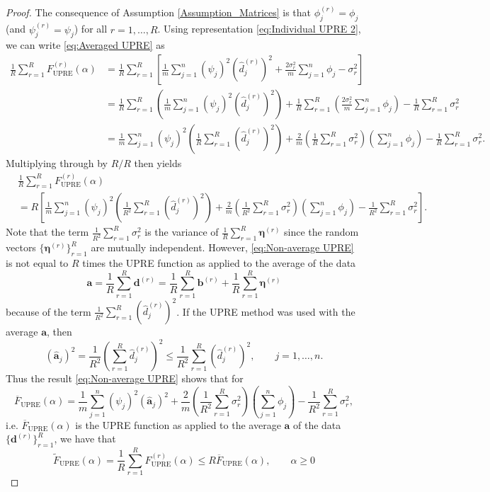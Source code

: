 \documentclass[12pt]{article}
\newcommand{\mA}{m}	%
\newcommand{\aVec}{\mathbf{a}}	%
\newcommand{\bVec}{\mathbf{b}}	%
\newcommand{\dVec}{\mathbf{d}}	%
\newcommand{\dft}[1]{\widehat{#1}}	%
\newcommand{\regparam}{\alpha}  %
\newcommand{\filt}{\phi}
\newcommand{\mfilt}{\psi}
\newcommand{\noise}{\eta}	%
\newcommand{\noiseSD}{\sigma}	%
\newcommand{\noiseVec}{\bm{\noise}}	%
\newcommand{\U}{F_{\text{UPRE}}}	%
\newcommand{\UBig}{\widetilde{F}_{\text{UPRE}}}	%
\newcommand{\UAvg}{\overline{F}_{\text{UPRE}}}	%
\begin{document}
\begin{proof}
The consequence of Assumption \ref{Assumption_Matrices} is that $\filt_j^{(r)} = \filt_j$ (and $\mfilt_j^{(r)} = \mfilt_j$) for all $r = 1,\ldots,R$. Using representation \eqref{eq:Individual UPRE 2}, we can write \eqref{eq:Averaged UPRE} as
\begin{align*}
\frac{1}{R} \sum_{r=1}^R \U^{(r)}(\regparam) &= \frac{1}{R} \sum_{r=1}^R \left[\frac{1}{\mA}\sum_{j=1}^{n} \left(\mfilt_j\right)^2\left(\dft{d}_j^{(r)}\right)^2 + \frac{2\noiseSD_r^2}{\mA} \sum_{j=1}^{n} \filt_j - \noiseSD_r^2\right] \\
&= \frac{1}{R} \sum_{r=1}^R \left(\frac{1}{\mA}\sum_{j=1}^{n} \left(\mfilt_j\right)^2\left(\dft{d}_j^{(r)}\right)^2\right) + \frac{1}{R} \sum_{r=1}^R \left(\frac{2\noiseSD_r^2}{\mA} \sum_{j=1}^{n} \filt_j\right) - \frac{1}{R} \sum_{r=1}^R\noiseSD_r^2 \\
&= \frac{1}{\mA}\sum_{j=1}^{n} \left(\mfilt_j\right)^2\left(\frac{1}{R} \sum_{r=1}^R \left(\dft{d}_j^{(r)}\right)^2\right) + \frac{2}{\mA} \left(\frac{1}{R} \sum_{r=1}^R \noiseSD_r^2\right) \left(\sum_{j=1}^{n} \filt_j\right) - \frac{1}{R} \sum_{r=1}^R\noiseSD_r^2.
\end{align*}
Multiplying through by $R/R$ then yields
\begin{align}
\label{eq:Non-average UPRE}
&\frac{1}{R} \sum_{r=1}^R \U^{(r)}(\regparam) \nonumber \\
&= R\left[\frac{1}{\mA}\sum_{j=1}^{n} \left(\mfilt_j\right)^2\left(\frac{1}{R^2} \sum_{r=1}^R \left(\dft{d}_j^{(r)}\right)^2\right) + \frac{2}{\mA} \left(\frac{1}{R^2} \sum_{r=1}^R \noiseSD_r^2\right) \left(\sum_{j=1}^{n} \filt_j\right) - \frac{1}{R^2} \sum_{r=1}^R\noiseSD_r^2\right].
\end{align}
Note that the term $\frac{1}{R^2} \sum_{r=1}^R\noiseSD_r^2$ is the variance of $\frac{1}{R} \sum_{r=1}^R \noiseVec^{(r)}$ since the random vectors $\{\noiseVec^{(r)}\}_{r=1}^R$ are mutually independent. However, \eqref{eq:Non-average UPRE} is not equal to $R$ times the UPRE function as applied to the average of the data
\[\aVec = \frac{1}{R}\sum_{r=1}^R \dVec^{(r)} = \frac{1}{R} \sum_{r=1}^R \bVec^{(r)} + \frac{1}{R} \sum_{r=1}^R \noiseVec^{(r)}\]
because of the term $\frac{1}{R^2} \sum_{r=1}^R \left(\dft{d}_j^{(r)}\right)^2$. If the UPRE method was used with the average $\aVec$, then
\begin{equation}
\label{eq:Coefficients of Average}
\left(\dft{\aVec}_j\right)^2 = \frac{1}{R^2}\left(\sum_{r=1}^R \dft{d}_j^{(r)}\right)^2 \leq \frac{1}{R^2} \sum_{r=1}^R \left(\dft{d}_j^{(r)}\right)^2, \qquad j = 1,\ldots,n.
\end{equation}
Thus the result \eqref{eq:Non-average UPRE} shows that for
\[\UAvg(\regparam) = \frac{1}{\mA}\sum_{j=1}^{n} \left(\mfilt_j\right)^2\left(\dft{\aVec}_j\right)^2 + \frac{2}{\mA} \left(\frac{1}{R^2} \sum_{r=1}^R \noiseSD_r^2\right) \left(\sum_{j=1}^{n} \filt_j\right) - \frac{1}{R^2} \sum_{r=1}^R\noiseSD_r^2,\]
i.e. $\UAvg(\regparam)$ is the UPRE function as applied to the average $\aVec$ of the data $\{\dVec^{(r)}\}_{r=1}^R$, we have that
\[\UBig(\regparam) = \frac{1}{R} \sum_{r=1}^R \U^{(r)}(\regparam) \leq R \UAvg(\regparam), \qquad \regparam \geq 0\]
\end{proof}
\end{document}
